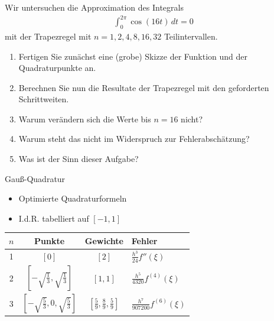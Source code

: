   \begin{Aufgabe}
    Wir untersuchen die Approximation des Integrals
    \begin{gather*}
      \int_0^{2\pi} \cos(16t)\,dt = 0
    \end{gather*}
    mit der Trapezregel mit $n=1,2,4,8,16,32$ Teilintervallen.
    \begin{enumerate}
    \item Fertigen Sie zunächst eine (grobe) Skizze der Funktion und
      der Quadraturpunkte an.
    \item Berechnen Sie nun die Resultate der Trapezregel mit den
      geforderten Schrittweiten.
    \item Warum verändern sich die Werte bis $n=16$ nicht?
    \item Warum steht das nicht im Widerspruch zur Fehlerabschätzung?
    \item Was ist der Sinn dieser Aufgabe?
    \end{enumerate}
  \end{Aufgabe}

\begin{frame}{Gauß-Quadratur}
    \begin{itemize}
        \item Optimierte Quadraturformeln
        \item I.d.R. tabelliert auf $[-1,1]$
    \end{itemize}
    \begin{center}
        \begin{tabular}{|c|c|c|l|}
        \hline
        $n$ & Punkte & Gewichte & Fehler\\\hline
            \vphantom{$\displaystyle\int$}1
            & $\left[0\right]$ & $\left[2\right]$
            & $\tfrac{h^3}{24} f''(\xi)$\\
            \vphantom{$\displaystyle\int$}2
            & $\left[-\sqrt{\frac13},\sqrt{\frac13}\right]$
            & $\left[1,1\right]$
            & $\tfrac{h^5}{4320} f^{(4)}(\xi)$\\
            \vphantom{$\displaystyle\int$}3
            & $\left[-\sqrt{\frac53},0,\sqrt{\frac53}\right]$
            & $\left[\frac59,\frac89,\frac59\right]$
            & $\tfrac{h^7}{907200} f^{(6)}(\xi)$\\
            \hline
        \end{tabular}
    \end{center}
\end{frame}

